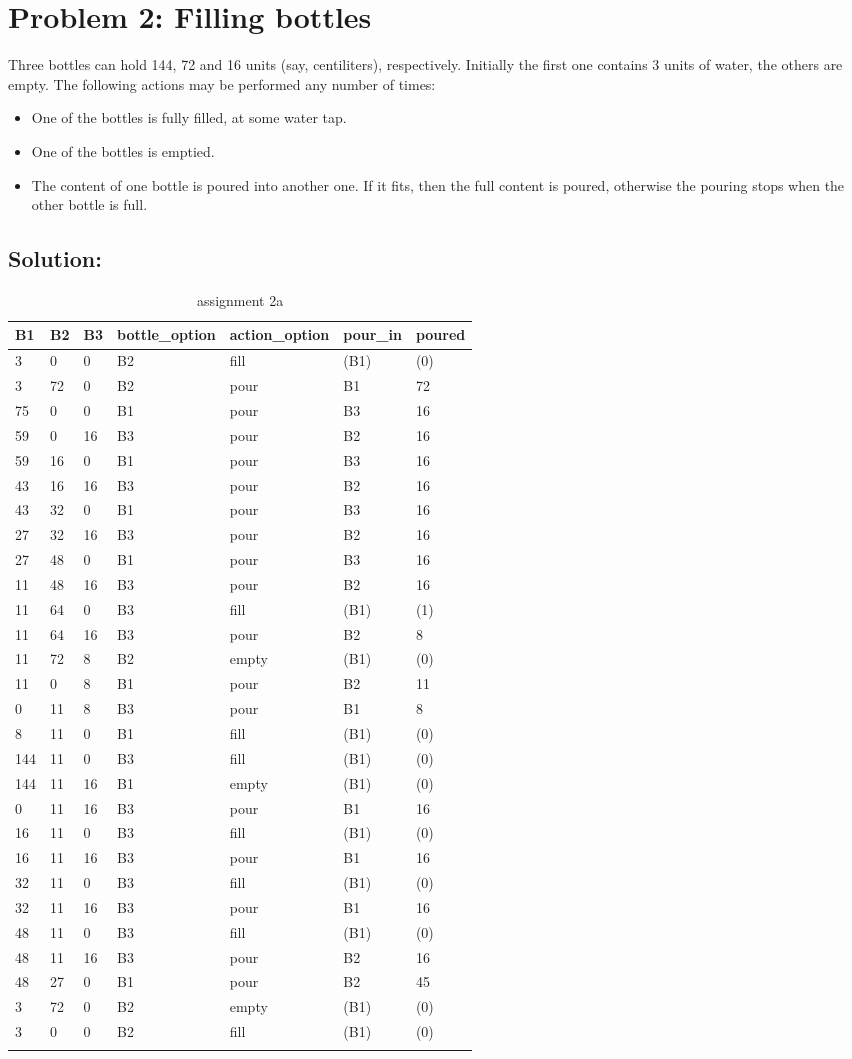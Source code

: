 \documentclass[a4paper]{article}
\begin{document}
	\section*{Problem 2: Filling bottles}
	Three bottles can hold 144, 72 and 16 units (say, centiliters), respectively. Initially the
first one contains 3 units of water, the others are empty. The following actions may be performed any number of times:
\begin{itemize}
\item One of the bottles is fully filled, at some water tap.
\item One of the bottles is emptied.
\item The content of one bottle is poured into another one. If it fits, then the full content
is poured, otherwise the pouring stops when the other bottle is full.
\end{itemize}

	\subsection*{Solution:}

	\begin{longtable}[c]{@{}lllllll@{}}
		\toprule
		B1 & B2 & B3 & bottle\_option & action\_option & pour\_in &
		poured\tabularnewline
		\midrule
		\endhead
		3 & 0 & 0 & B2 & fill & (B1) & (0)\tabularnewline
		3 & 72 & 0 & B2 & pour & B1 & 72\tabularnewline
		75 & 0 & 0 & B1 & pour & B3 & 16\tabularnewline
		59 & 0 & 16 & B3 & pour & B2 & 16\tabularnewline
		59 & 16 & 0 & B1 & pour & B3 & 16\tabularnewline
		43 & 16 & 16 & B3 & pour & B2 & 16\tabularnewline
		43 & 32 & 0 & B1 & pour & B3 & 16\tabularnewline
		27 & 32 & 16 & B3 & pour & B2 & 16\tabularnewline
		27 & 48 & 0 & B1 & pour & B3 & 16\tabularnewline
		11 & 48 & 16 & B3 & pour & B2 & 16\tabularnewline
		11 & 64 & 0 & B3 & fill & (B1) & (1)\tabularnewline
		11 & 64 & 16 & B3 & pour & B2 & 8\tabularnewline
		11 & 72 & 8 & B2 & empty & (B1) & (0)\tabularnewline
		11 & 0 & 8 & B1 & pour & B2 & 11\tabularnewline
		0 & 11 & 8 & B3 & pour & B1 & 8\tabularnewline
		8 & 11 & 0 & B1 & fill & (B1) & (0)\tabularnewline
		144 & 11 & 0 & B3 & fill & (B1) & (0)\tabularnewline
		144 & 11 & 16 & B1 & empty & (B1) & (0)\tabularnewline
		0 & 11 & 16 & B3 & pour & B1 & 16\tabularnewline
		16 & 11 & 0 & B3 & fill & (B1) & (0)\tabularnewline
		16 & 11 & 16 & B3 & pour & B1 & 16\tabularnewline
		32 & 11 & 0 & B3 & fill & (B1) & (0)\tabularnewline
		32 & 11 & 16 & B3 & pour & B1 & 16\tabularnewline
		48 & 11 & 0 & B3 & fill & (B1) & (0)\tabularnewline
		48 & 11 & 16 & B3 & pour & B2 & 16\tabularnewline
		48 & 27 & 0 & B1 & pour & B2 & 45\tabularnewline
		3 & 72 & 0 & B2 & empty & (B1) & (0)\tabularnewline
		3 & 0 & 0 & B2 & fill & (B1) & (0)\tabularnewline
		\bottomrule
		\caption{assignment 2a}
		\label{tab:2a}
	\end{longtable}
	
\end{document}
